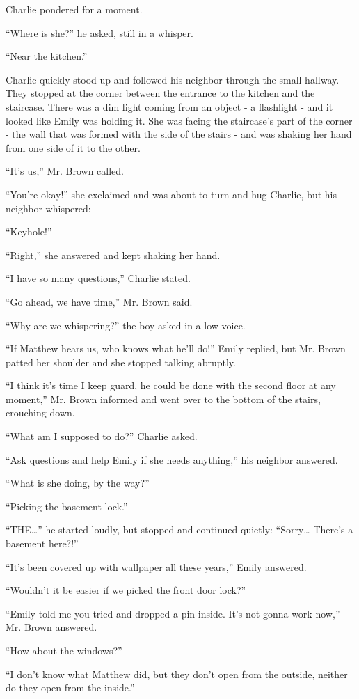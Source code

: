 Charlie pondered for a moment.

“Where is she?” he asked, still in a whisper.

“Near the kitchen.”

Charlie quickly stood up and followed his neighbor through the small hallway. They stopped at the corner between the entrance to the kitchen and the staircase. There was a dim light coming from an object - a flashlight - and it looked like Emily was holding it. She was facing the staircase's part of the corner - the wall that was formed with the side of the stairs - and was shaking her hand from one side of it to the other.

“It's us,” Mr. Brown called.

“You're okay!” she exclaimed and was about to turn and hug Charlie, but his neighbor whispered:

“Keyhole!”

“Right,” she answered and kept shaking her hand.

“I have so many questions,” Charlie stated.

“Go ahead, we have time,” Mr. Brown said.

“Why are we whispering?” the boy asked in a low voice.

“If Matthew hears us, who knows what he'll do!” Emily replied, but Mr. Brown patted her shoulder and she stopped talking abruptly.

“I think it's time I keep guard, he could be done with the second floor at any moment,” Mr. Brown informed and went over to the bottom of the stairs, crouching down.

“What am I supposed to do?” Charlie asked.

“Ask questions and help Emily if she needs anything,” his neighbor answered.

“What is she doing, by the way?”

“Picking the basement lock.”

“THE…” he started loudly, but stopped and continued quietly: “Sorry… There's a basement here?!”

“It's been covered up with wallpaper all these years,” Emily answered.

“Wouldn't it be easier if we picked the front door lock?”

“Emily told me you tried and dropped a pin inside. It's not gonna work now,” Mr. Brown answered.

“How about the windows?”

“I don't know what Matthew did, but they don't open from the outside, neither do they open from the inside.”

